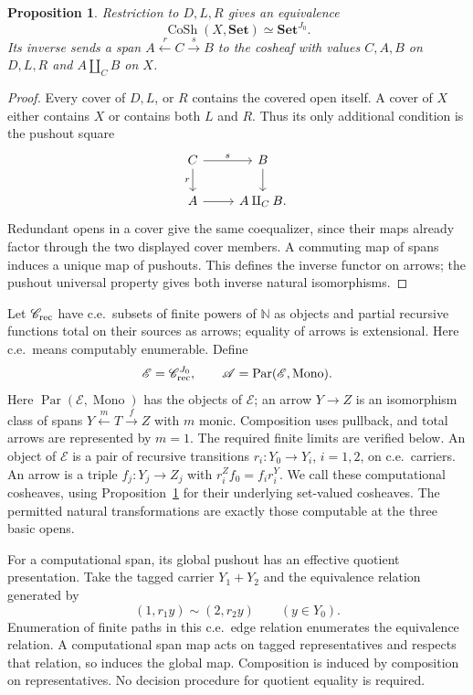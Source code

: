 \documentclass[11pt]{article}
\newtheorem{proposition}[theorem]{Proposition}
\newcommand{\N}{\mathbb N}
\newcommand{\Set}{\mathbf{Set}}
\newcommand{\Par}{\operatorname{Par}}
\newcommand{\E}{\mathscr E}
\newcommand{\A}{\mathscr A}
\newcommand{\C}{\mathscr C}
\begin{document}
\begin{proposition}\label{prop:cosheaf-equivalence}
Restriction to $D,L,R$ gives an equivalence
\[
 \operatorname{CoSh}(X,\Set)\simeq\Set^{J_0}.
\]
Its inverse sends a span $A\xleftarrow{r}C\xrightarrow{s}B$
to the cosheaf with values $C,A,B$ on $D,L,R$ and
$A\amalg_C B$ on $X$.
\end{proposition}
\begin{proof}
Every cover of $D,L$, or $R$ contains the covered open itself.
A cover of $X$ either contains $X$ or contains both $L$ and $R$.
Thus its only additional condition is the pushout square
\[
\begin{tikzcd}
C\arrow[r,"s"]\arrow[d,"r"']&B\arrow[d]\\
A\arrow[r]&A\amalg_C B.
\end{tikzcd}
\]
Redundant opens in a cover give the same coequalizer, since their
maps already factor through the two displayed cover members.
A commuting map of spans induces a unique map of pushouts.
This defines the inverse functor on arrows; the pushout universal
property gives both inverse natural isomorphisms.
\end{proof}

Let $\C_{\rm rec}$ have c.e.\ subsets of finite powers of $\N$
as objects and partial recursive functions total on their sources as
arrows; equality of arrows is extensional. Here c.e.\ means
computably enumerable. Define
\[
 \E=\C_{\rm rec}^{J_0},\qquad \A=\Par(\E,\operatorname{Mono}).
\]
Here $\Par(\E,\operatorname{Mono})$ has the objects of $\E$;
an arrow $Y\to Z$ is an isomorphism class of spans
$Y\xleftarrow{m}T\xrightarrow{f}Z$ with $m$ monic.
Composition uses pullback, and total arrows are represented by $m=1$.
The required finite limits are verified below.
An object of $\E$ is a pair of recursive transitions
$r_i:Y_0\to Y_i$, $i=1,2$, on c.e.\ carriers.
An arrow is a triple $f_j:Y_j\to Z_j$ with
$r_i^Zf_0=f_i r_i^Y$.
We call these computational cosheaves, using
Proposition~\ref{prop:cosheaf-equivalence} for their underlying
set-valued cosheaves. The permitted natural transformations are
exactly those computable at the three basic opens.

For a computational span, its global pushout has an effective quotient
presentation. Take the tagged carrier $Y_1+Y_2$ and the equivalence
relation generated by
\[
 (1,r_1 y)\sim(2,r_2 y)\qquad(y\in Y_0).
\]
Enumeration of finite paths in this c.e.\ edge relation enumerates
the equivalence relation. A computational span map acts on tagged
representatives and respects that relation, so induces the global
map. Composition is induced by composition on representatives.
No decision procedure for quotient equality is required.
\end{document}
